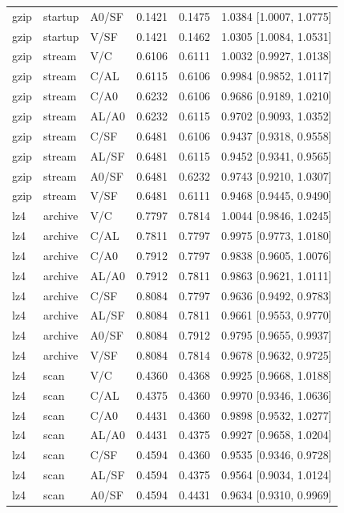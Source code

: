 \begin{longtable}{lllrrl}
gzip & startup & A0/SF & 0.1421 & 0.1475 & 1.0384 [1.0007, 1.0775] \\
gzip & startup & V/SF & 0.1421 & 0.1462 & 1.0305 [1.0084, 1.0531] \\
gzip & stream & V/C & 0.6106 & 0.6111 & 1.0032 [0.9927, 1.0138] \\
gzip & stream & C/AL & 0.6115 & 0.6106 & 0.9984 [0.9852, 1.0117] \\
gzip & stream & C/A0 & 0.6232 & 0.6106 & 0.9686 [0.9189, 1.0210] \\
gzip & stream & AL/A0 & 0.6232 & 0.6115 & 0.9702 [0.9093, 1.0352] \\
gzip & stream & C/SF & 0.6481 & 0.6106 & 0.9437 [0.9318, 0.9558] \\
gzip & stream & AL/SF & 0.6481 & 0.6115 & 0.9452 [0.9341, 0.9565] \\
gzip & stream & A0/SF & 0.6481 & 0.6232 & 0.9743 [0.9210, 1.0307] \\
gzip & stream & V/SF & 0.6481 & 0.6111 & 0.9468 [0.9445, 0.9490] \\
lz4 & archive & V/C & 0.7797 & 0.7814 & 1.0044 [0.9846, 1.0245] \\
lz4 & archive & C/AL & 0.7811 & 0.7797 & 0.9975 [0.9773, 1.0180] \\
lz4 & archive & C/A0 & 0.7912 & 0.7797 & 0.9838 [0.9605, 1.0076] \\
lz4 & archive & AL/A0 & 0.7912 & 0.7811 & 0.9863 [0.9621, 1.0111] \\
lz4 & archive & C/SF & 0.8084 & 0.7797 & 0.9636 [0.9492, 0.9783] \\
lz4 & archive & AL/SF & 0.8084 & 0.7811 & 0.9661 [0.9553, 0.9770] \\
lz4 & archive & A0/SF & 0.8084 & 0.7912 & 0.9795 [0.9655, 0.9937] \\
lz4 & archive & V/SF & 0.8084 & 0.7814 & 0.9678 [0.9632, 0.9725] \\
lz4 & scan & V/C & 0.4360 & 0.4368 & 0.9925 [0.9668, 1.0188] \\
lz4 & scan & C/AL & 0.4375 & 0.4360 & 0.9970 [0.9346, 1.0636] \\
lz4 & scan & C/A0 & 0.4431 & 0.4360 & 0.9898 [0.9532, 1.0277] \\
lz4 & scan & AL/A0 & 0.4431 & 0.4375 & 0.9927 [0.9658, 1.0204] \\
lz4 & scan & C/SF & 0.4594 & 0.4360 & 0.9535 [0.9346, 0.9728] \\
lz4 & scan & AL/SF & 0.4594 & 0.4375 & 0.9564 [0.9034, 1.0124] \\
lz4 & scan & A0/SF & 0.4594 & 0.4431 & 0.9634 [0.9310, 0.9969] \\

\end{longtable}
